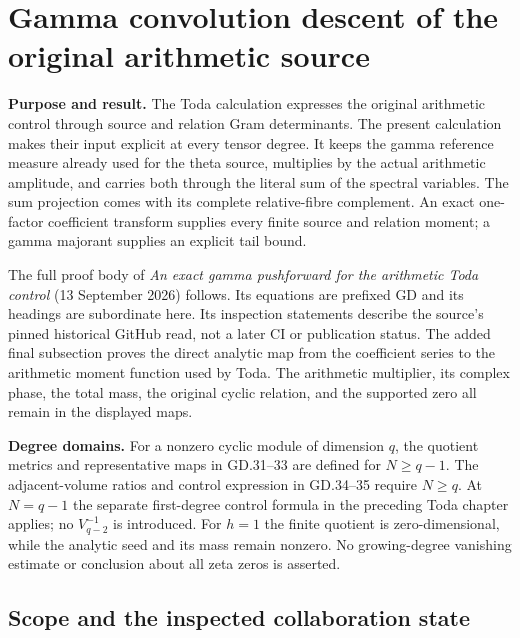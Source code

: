 \section{Gamma convolution descent of the original arithmetic source}
\label{sec:gamma-convolution-descent}

\textbf{Purpose and result.}
The Toda calculation expresses the original arithmetic control through
source and relation Gram determinants. The present calculation makes their
input explicit at every tensor degree. It keeps the gamma reference measure
already used for the theta source, multiplies by the actual arithmetic
amplitude, and carries both through the literal sum of the spectral variables.
The sum projection comes with its complete relative-fibre complement.
An exact one-factor coefficient transform supplies every finite source and
relation moment; a gamma majorant supplies an explicit tail bound.

The full proof body of \emph{An exact gamma pushforward for the arithmetic
Toda control} (13 September 2026) follows. Its equations are prefixed GD
and its headings are subordinate here. Its inspection statements describe
the source's pinned historical GitHub read, not a later CI or publication
status. The added final subsection proves the direct analytic map from
the coefficient series to the arithmetic moment function used by Toda.
The arithmetic multiplier, its complex phase, the total mass, the original
cyclic relation, and the supported zero all remain in the displayed maps.

\textbf{Degree domains.}
For a nonzero cyclic module of dimension \(q\), the quotient metrics and
representative maps in GD.31--33 are defined for \(N\geq q-1\).
The adjacent-volume ratios and control expression in GD.34--35 require
\(N\geq q\). At \(N=q-1\) the separate first-degree control formula in
the preceding Toda chapter applies; no \(V_{q-2}^{-1}\) is introduced.
For \(h=1\) the finite quotient is zero-dimensional, while the analytic
seed and its mass remain nonzero. No growing-degree vanishing estimate
or conclusion about all zeta zeros is asserted.

\begingroup
\setlength{\emergencystretch}{3em}
\providecommand{\tightlist}{\setlength{\itemsep}{0pt}\setlength{\parskip}{0pt}}

\subsection[\hspace{0.4em}Scope and the inspected collaboration
state]{Scope and the inspected collaboration
state}\label{gammad-scope-and-the-inspected-collaboration-state}

